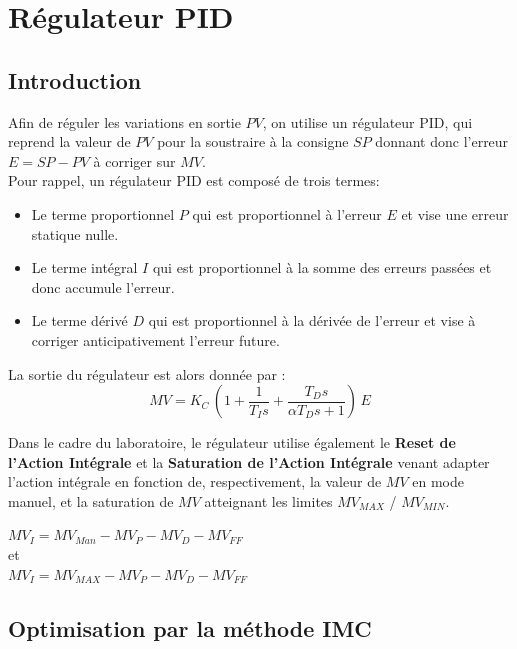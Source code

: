 \section{Régulateur PID}

\subsection{Introduction}

Afin de réguler les variations en sortie $PV$, on utilise un régulateur PID, qui reprend la valeur de $PV$ pour la soustraire à la consigne $SP$ donnant donc l'erreur $E = SP - PV$ à corriger sur $MV$.\\
Pour rappel, un régulateur PID est composé de trois termes:
\begin{itemize}
    \item Le terme proportionnel $P$ qui est proportionnel à l'erreur $E$ et vise une erreur statique nulle.
    \item Le terme intégral $I$ qui est proportionnel à la somme des erreurs passées et donc accumule l'erreur.
    \item Le terme dérivé $D$ qui est proportionnel à la dérivée de l'erreur et vise à corriger anticipativement l'erreur future.
\end{itemize}
La sortie du régulateur est alors donnée par :
\begin{equation}
    MV = K_C \, \left( 1 + \frac{1}{T_I s} + \frac{T_D s}{\alpha T_D s + 1}\right) \, E
\end{equation}

Dans le cadre du laboratoire, le régulateur utilise également le \textbf{Reset de l'Action Intégrale} et la \textbf{Saturation de l'Action Intégrale} venant adapter l'action intégrale en fonction de, respectivement, la valeur de $MV$ en mode manuel, et la saturation de $MV$ atteignant les limites $MV_{MAX}$ / $MV_{MIN}$.
\begin{center}
    $MV_I = MV_{Man} - MV_P - MV_D - MV_{FF}$\\[4pt]
    et\\[4pt]
    $MV_I = MV_{MAX} - MV_P - MV_D - MV_{FF}$
\end{center}

\subsection{Optimisation par la méthode IMC}

